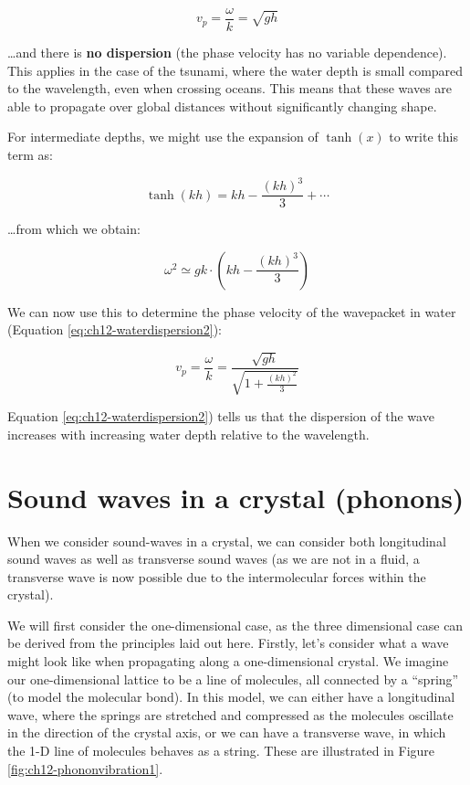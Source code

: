 \documentclass[
]{book}
\begin{document}
\begin{equation}
v_p = \frac{\omega}{k} = \sqrt{gh}
\end{equation}

\ldots and there is \textbf{no dispersion} (the phase velocity has no variable dependence). This applies in the case of the tsunami, where the water depth is small compared to the wavelength, even when crossing oceans. This means that these waves are able to propagate over global distances without significantly changing shape.

For intermediate depths, we might use the expansion of \(\tanh(x)\) to write this term as:

\begin{equation}
\tanh(kh) = kh - \frac{(kh)^3}{3} + \cdots
\end{equation}

\ldots from which we obtain:

\begin{equation}
\omega^2 \simeq gk \cdot \left(kh - \frac{(kh)^3}{3} \right)
\end{equation}

We can now use this to determine the phase velocity of the wavepacket in water (Equation \eqref{eq:ch12-waterdispersion2}):

\begin{equation}
v_p = \frac{\omega}{k} = \frac{\sqrt{gh}}{\sqrt{1+\frac{(kh)^2}{3}}}
\label{eq:ch12-waterdispersion2}
\end{equation}

Equation \eqref{eq:ch12-waterdispersion2}) tells us that the dispersion of the wave increases with increasing water depth relative to the wavelength.

\hypertarget{sec:ch12-phonondispersion}{%
\section{Sound waves in a crystal (phonons)}\label{sec:ch12-phonondispersion}}

When we consider sound-waves in a crystal, we can consider both longitudinal sound waves as well as transverse sound waves (as we are not in a fluid, a transverse wave is now possible due to the intermolecular forces within the crystal).

We will first consider the one-dimensional case, as the three dimensional case can be derived from the principles laid out here. Firstly, let's consider what a wave might look like when propagating along a one-dimensional crystal. We imagine our one-dimensional lattice to be a line of molecules, all connected by a ``spring'' (to model the molecular bond). In this model, we can either have a longitudinal wave, where the springs are stretched and compressed as the molecules oscillate in the direction of the crystal axis, or we can have a transverse wave, in which the 1-D line of molecules behaves as a string. These are illustrated in Figure \ref{fig:ch12-phononvibration1}.
\end{document}
